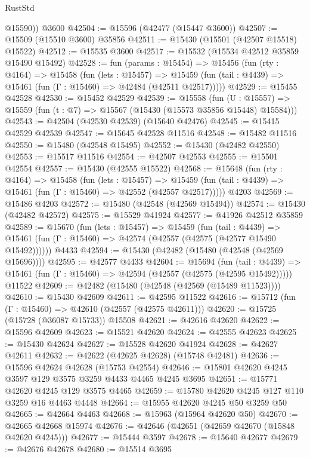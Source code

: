 \begin{lexlean}{RustStd}
\begin{coremodule}
{\begin{coremodule}
{{{{{{{{{{{{{{{{{{{{{{{{{{{{{{{{{{{{{{{{{{{{{{{{{{{{{{{{{{{{        @15590))
    @3600
@42504 := @15596 (@42477 (@15447 @3600))
@42507 := @15509 (@15510 @3600) @35856
@42511 := @15430 (@15501 (@42507 @15518) @15522)
@42512 := @15535 @3600
@42517 := @15532 (@15534 @42512 @35859 @15490 @15492)
@42528 := fun (params : @15454) =>
  @15456
    (fun (rty : @4164) =>
    @15458
      (fun (lets : @15457) =>
      @15459 (fun (tail : @4439) => @15461 (fun (Γ : @15460) => @42484 (@42511 @42517)))))
@42529 := @15455 @42528
@42530 := @15452 @42529
@42539 := @15558
    (fun (U : @15557) => @15559 (fun (t : @7) => @15567 (@15430 (@15573 @35856 @15448) @15584)))
@42543 := @42504 (@42530 @42539) (@15640 @42476)
@42545 := @15415 @42529 @42539
@42547 := @15645 @42528 @11516
@42548 := @15482 @11516
@42550 := @15480 (@42548 @15495)
@42552 := @15430 (@42482 @42550)
@42553 := @15517 @11516
@42554 := @42507 @42553
@42555 := @15501 @42554
@42557 := @15430 (@42555 @15522)
@42568 := @15648
    (fun (rty : @4164) =>
    @15458
      (fun (lets : @15457) =>
      @15459 (fun (tail : @4439) => @15461 (fun (Γ : @15460) => @42552 (@42557 @42517)))))
    @4203
@42569 := @15486 @4203
@42572 := @15480 (@42548 (@42569 @15494))
@42574 := @15430 (@42482 @42572)
@42575 := @15529 @41924
@42577 := @41926 @42512 @35859
@42589 := @15670
    (fun (lets : @15457) =>
    @15459
      (fun (tail : @4439) =>
      @15461 (fun (Γ : @15460) => @42574 (@42557 (@42575 (@42577 @15490 @15492))))))
    @4433
@42594 := @15430 (@42482 (@15480 (@42548 (@42569 @15696))))
@42595 := @42577 @4433
@42604 := @15694
    (fun (tail : @4439) => @15461 (fun (Γ : @15460) => @42594 (@42557 (@42575 (@42595 @15492)))))
    @11522
@42609 := @42482 (@15480 (@42548 (@42569 (@15489 @11523))))
@42610 := @15430 @42609
@42611 := @42595 @11522
@42616 := @15712 (fun (Γ : @15460) => @42610 (@42557 (@42575 @42611)))
@42620 := @15725 (@15728 (@36087 @15733)) @15508
@42621 := @42616 @42620
@42622 := @15596 @42609
@42623 := @15521 @42620
@42624 := @42555 @42623
@42625 := @15430 @42624
@42627 := @15528 @42620 @41924
@42628 := @42627 @42611
@42632 := @42622 (@42625 @42628) (@15748 @42481)
@42636 := @15596 @42624 @42628 (@15753 @42554)
@42646 := @15801 @42620 @4245 @3597 @129 @3575 @3259 @4433 @4465 @4245 @3695
@42651 := @15771 @42620 @4245 @129 @3575 @4465
@42659 := @15780 @42620 @4245 @127 @110 @3259 @16 @4463 @4448
@42664 := @15955 @42620 @4245 @50 @3259 @50
@42665 := @42664 @4463
@42668 := @15963 (@15964 @42620 @50)
@42670 := @42665 @42668 @15974
@42676 := @42646 (@42651 (@42659 @42670 (@15848 @42620 @4245)))
@42677 := @15444 @3597
@42678 := @15640 @42677
@42679 := @42676 @42678
@42680 := @15514 @3695
}}}}}}}}}}}}}}}}}}}}}}}}}}}}}}}}}}}}}}}}}}}}}}}}}}}}}}}}}}}}
\end{coremodule}}
\end{coremodule}
\end{lexlean}
